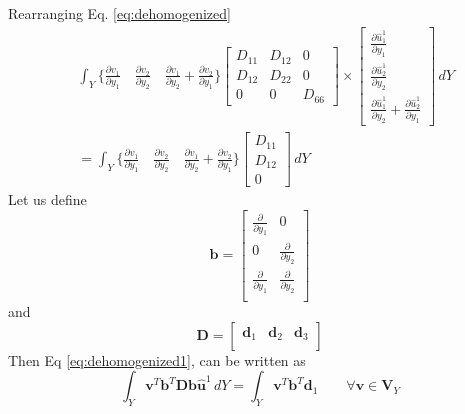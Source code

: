 \documentclass[openright,twoside]{iitkthesis}
\newcommand{\e}[1]{\textbf{#1}}
\begin{document}
Rearranging Eq. \eqref{eq:dehomogenized}
\begin{equation}
\label{eq:dehomogenized1}
\begin{split}
&\int_Y\bigg\{\frac{\partial v_1}{\partial y_1}\quad\frac{\partial v_2}{\partial y_2}\quad\frac{\partial v_1}{\partial y_2}+\frac{\partial v_2}{\partial y_1}\bigg\}
\begin{bmatrix}
D_{11}    & D_{12} &     0 \\
D_{12}    & D_{22} &     0 \\
0        & 0        &    D_{66}
\end{bmatrix}\times
\begin{bmatrix}
\frac{\partial \hat u^1_1}{\partial y_1}\\
\frac{\partial \hat u^1_2}{\partial y_2}\\
\frac{\partial \hat u^1_1}{\partial y_2}+\frac{\partial \hat u^1_2}{\partial y_1}
\end{bmatrix}\,dY\\
&=\int_Y\bigg\{\frac{\partial v_1}{\partial y_1}\quad\frac{\partial v_2}{\partial y_2}\quad\frac{\partial v_1}{\partial y_2}+\frac{\partial v_2}{\partial y_1}\bigg\}
\begin{bmatrix}
D_{11}\\
D_{12}\\
0
\end{bmatrix}\,dY
\end{split}
\end{equation}
Let us define
\begin{equation}
\textbf{b} = \begin{bmatrix}
\frac{\partial}{\partial y_1} & 0\\
0 & \frac{\partial}{\partial y_2}\\
\frac{\partial}{\partial y_1} &\frac{\partial}{\partial y_2}\\
\end{bmatrix}
\end{equation}
and 
\begin{equation}
\textbf{D} = \begin{bmatrix}
\textbf{d}_1 & \textbf{d}_2 & \textbf{d}_3\\
\end{bmatrix}
\end{equation}
Then Eq \eqref{eq:dehomogenized1}, can be written as
\begin{equation}
\int_Y \textbf{v}^T \textbf{b}^T \textbf{D} \textbf{b}\hat{\e u}^1 \,dY = \int_Y\textbf{v}^T\textbf{b}^T\textbf{d}_1 \qquad \forall \textbf{v}\in\textbf{V}_Y
\end{equation}
\end{document}
